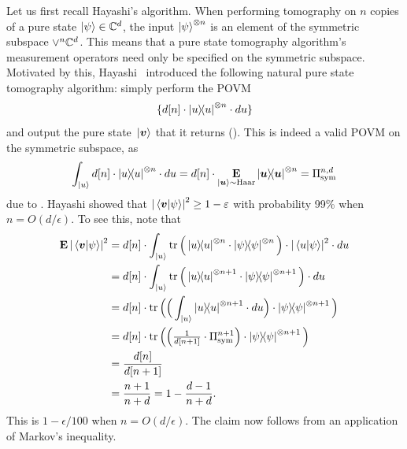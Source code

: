 \documentclass{article}
\begin{document}
Let us first recall Hayashi's algorithm. When performing tomography on $n$ copies of a pure state $\ket{\psi} \in \mathbb C^d$,
the input $\ket{\psi}^{\otimes n}$ is an element of the symmetric subspace $\lor^n \mathbb C^d$.
This means that a pure state tomography algorithm's measurement operators need only be specified on the symmetric subspace.
Motivated by this, Hayashi~\cite{Hay98} introduced the following natural pure state tomography algorithm:
simply perform the POVM
\begin{equation}
    \{d[n] \cdot \ketbra{u}^{\otimes n} \cdot du\}
\end{equation}
and output the pure state $\ket*{\boldsymbol{v}}$ that it returns ().
This is indeed a valid POVM on the symmetric subspace, as
\begin{equation*}
    \int_{\ket{u}} d[n] \cdot \ketbra{u}^{\otimes n} \cdot du
    = d[n] \cdot \mathop{\bf E\/}_{\ket{\boldsymbol{u}} \sim \mathrm{Haar}} \ketbra{\boldsymbol{u}}^{\otimes n}
    = \Pi_{\mathrm{sym}}^{n, d}
\end{equation*}
due to .
Hayashi showed that $\abs{\braket*{\boldsymbol{v}}{\psi}}^2 \geq 1- \varepsilon$ with probability 99\% when $n = O(d/\epsilon)$. To see this, note that
\begin{align}
    \mathop{\bf E\/}\abs{\braket*{\boldsymbol{v}}{\psi}}^2
    &= d[n] \cdot \int_{\ket{u}} \tr\Big(\ketbra{u}^{\otimes n} \cdot \ketbra{\psi}^{\otimes n}\Big) \cdot \abs{\braket*{u}{\psi}}^2 \cdot du\nonumber\\
    &= d[n] \cdot \int_{\ket{u}} \tr\Big( \ketbra{u}^{\otimes n + 1} \cdot \ketbra{\psi}^{\otimes n+1}\Big) \cdot du\nonumber\\
    &= d[n] \cdot  \tr\Big(\Big(\int_{\ket{u}} \ketbra{u}^{\otimes n + 1} \cdot du \Big) \cdot \ketbra{\psi}^{\otimes n+1}\Big)\nonumber\\
    &= d[n] \cdot  \tr\Big(\Big(\tfrac{1}{d[n+1]} \cdot \Pi_{\mathrm{sym}}^{n+1} \Big) \cdot \ketbra{\psi}^{\otimes n+1}\Big)\nonumber\\
    &= \frac{d[n]}{d[n+1]}\nonumber\\
    &= \frac{n+1}{n+d} = 1 - \frac{d-1}{n+d}.\label{eq:standard-lb}
\end{align}
This is $1 - \epsilon/100$ when $n = O(d/\epsilon)$. The claim now follows from an application of Markov's inequality.
\end{document}
